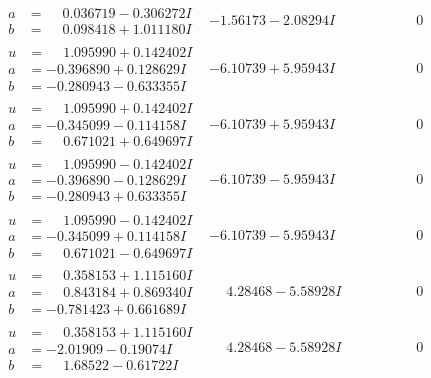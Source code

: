 \documentclass[1p]{elsarticle_modified}
\theoremstyle{definition}
\begin{document}
$$\begin{array}{c|c|c}
\begin{aligned}
a &= \phantom{-}0.036719 - 0.306272 I \\
b &= \phantom{-}0.098418 + 1.011180 I\end{aligned}
 & -1.56173 - 2.08294 I & \phantom{-0.000000 } 0 \\ \hline\begin{aligned}
u &= \phantom{-}1.095990 + 0.142402 I \\
a &= -0.396890 + 0.128629 I \\
b &= -0.280943 - 0.633355 I\end{aligned}
 & -6.10739 + 5.95943 I & \phantom{-0.000000 } 0 \\ \hline\begin{aligned}
u &= \phantom{-}1.095990 + 0.142402 I \\
a &= -0.345099 - 0.114158 I \\
b &= \phantom{-}0.671021 + 0.649697 I\end{aligned}
 & -6.10739 + 5.95943 I & \phantom{-0.000000 } 0 \\ \hline\begin{aligned}
u &= \phantom{-}1.095990 - 0.142402 I \\
a &= -0.396890 - 0.128629 I \\
b &= -0.280943 + 0.633355 I\end{aligned}
 & -6.10739 - 5.95943 I & \phantom{-0.000000 } 0 \\ \hline\begin{aligned}
u &= \phantom{-}1.095990 - 0.142402 I \\
a &= -0.345099 + 0.114158 I \\
b &= \phantom{-}0.671021 - 0.649697 I\end{aligned}
 & -6.10739 - 5.95943 I & \phantom{-0.000000 } 0 \\ \hline\begin{aligned}
u &= \phantom{-}0.358153 + 1.115160 I \\
a &= \phantom{-}0.843184 + 0.869340 I \\
b &= -0.781423 + 0.661689 I\end{aligned}
 & \phantom{-}4.28468 - 5.58928 I & \phantom{-0.000000 } 0 \\ \hline\begin{aligned}
u &= \phantom{-}0.358153 + 1.115160 I \\
a &= -2.01909 - 0.19074 I \\
b &= \phantom{-}1.68522 - 0.61722 I\end{aligned}
 & \phantom{-}4.28468 - 5.58928 I & \phantom{-0.000000 } 0\\

\end{array}$$
\end{document}
